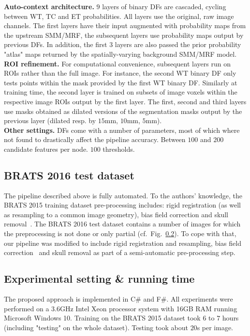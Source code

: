 \noindent
\textbf{Auto-context architecture.} $9$ layers of binary DFs are cascaded, cycling between WT, TC and ET probabilities. All layers use the original, raw image channels. The first layers have their input augmented with probability maps from the upstream SMM/MRF, the subsequent layers use probability maps output by previous DFs. In addition, the first $3$ layers are also passed the prior probability "atlas" maps returned by the spatially-varying background SMM/MRF model. \\

\noindent
\textbf{ROI refinement.} For computational convenience, subsequent layers run on ROIs rather than the full image. For instance, the second WT binary DF only tests points within the mask provided by the first WT binary DF. Similarly at training time, the second layer is trained on subsets of image voxels within the respective image ROIs output by the first layer. The first, second and third layers use masks obtained as dilated versions of the segmentation masks output by the previous layer (dilated resp. by $15$mm, $10$mm, $5$mm).\\

\noindent
\textbf{Other settings.} DFs come with a number of parameters, most of which where not found to drastically affect the pipeline accuracy. Between $100$ and $200$ candidate features per node. $100$ thresholds.

\subsection{BRATS 2016 test dataset}

The pipeline described above is fully automated. To the authors' knowledge, the BRATS 2015 training dataset pre-processing includes: rigid registration (as well as resampling to a common image geometry), bias field correction and skull removal~\cite{menze2015multimodal}. The BRATS 2016 test dataset contains a number of images for which the preprocessing is not done or only partial (cf.~Fig.~\ref{}). To cope with that, our pipeline was modified to include rigid registration and resampling, bias field correction~\cite{tustison2009n4itk} and skull removal as part of a semi-automatic pre-processing step.

\subsection{Experimental setting \& running time}

The proposed approach is implemented in C\# and F\#. All experiments were performed on a 3.6GHz Intel Xeon processor system with 16GB RAM running Microsoft Windows 10. Training on the BRATS 2015 dataset took $6$ to $7$ hours (including "testing" on the whole dataset). Testing took about $20$s per image.

